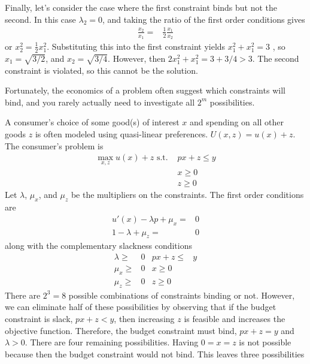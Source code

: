 \begin{example}
  Finally, let's consider the case where the first constraint binds
  but not the second. In this case $\lambda_2 = 0$, and taking the
  ratio of the first order conditions gives
  \begin{align*} 
    \frac{x_2}{x_1} = & \frac{1}{2} \frac{x_1}{x_2}
  \end{align*}
  or $x_2^2 = \frac{1}{2} x_1^2$. Substituting this into the first
  constraint yields $x_1^2 + x_1^2 = 3$ , so $x_1 = \sqrt{3/2}$, and
  $x_2 = \sqrt{3/4}$. However, then $2x_1^2 + x_1^2 = 3 + 3/4 >
  3$. The second constraint is violated, so this cannot be the solution.   
\end{example}
Fortunately, the economics of a problem often suggest which
constraints will bind, and you rarely actually need to investigate all
$2^m$ possibilities.
\begin{example}
  A consumer's choice of some good(s) of interest $x$ and spending on
  all other goods $z$ is often modeled using quasi-linear
  preferences. $U(x,z) = u(x) + z$. The consumer's problem is
  \begin{align*} 
    \max_{x,z} u(x) + z \text{ s.t. } & px + z \leq y \\
    & x \geq 0 \\
    & z \geq 0
  \end{align*}
  Let $\lambda$, $\mu_x$, and $\mu_z$ be the multipliers on the
  constraints. The first order conditions are
  \begin{align*}
    u'(x) - \lambda p + \mu_x = & 0 \\
    1 - \lambda + \mu_z = & 0
  \end{align*}
  along with the complementary slackness conditions
  \begin{align*}
    \lambda \geq & 0 & px + z \leq & y \\
    \mu_x \geq & 0 & x \geq 0 \\
    \mu_z \geq & 0 & z \geq 0
  \end{align*}
  There are $2^3 = 8$ possible combinations of constraints binding or
  not. However, we can eliminate half of these possibilities by
  observing that if the budget constraint is slack, $px + z < y$, then
  increasing $z$ is feasible and increases the objective
  function. Therefore, the budget constraint must bind, $px + z = y$
  and $\lambda > 0$. There are four remaining possibilities. Having $0
  = x = z$ is not possible because then the budget constraint would
  not bind. This leaves three possibilities
  \begin{enumerate}

\end{enumerate}
\end{example}
